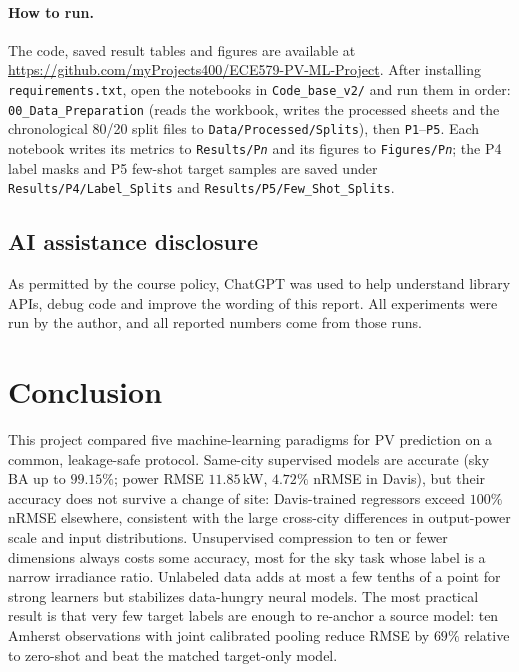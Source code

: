 \documentclass[11pt,letterpaper]{article}
\begin{document}
\paragraph{How to run.} The code, saved result tables and figures are available at
\url{https://github.com/myProjects400/ECE579-PV-ML-Project}. After installing
\texttt{requirements.txt}, open the notebooks in \texttt{Code\_base\_v2/} and run them in order:
\texttt{00\_Data\_Preparation} (reads the workbook, writes the processed sheets and the
chronological 80/20 split files to \texttt{Data/Processed/Splits}), then \texttt{P1}--\texttt{P5}.
Each notebook writes its metrics to \texttt{Results/P\textit{n}} and its figures to
\texttt{Figures/P\textit{n}}; the P4 label masks and P5 few-shot target samples are saved under
\texttt{Results/P4/Label\_Splits} and \texttt{Results/P5/Few\_Shot\_Splits}.

\subsection{AI assistance disclosure}
As permitted by the course policy, ChatGPT was used to help understand
library APIs, debug code and improve the wording of this report. All experiments were run by the
author, and all reported numbers come from those runs.

\section{Conclusion}
This project compared five machine-learning paradigms for PV prediction on a common, leakage-safe
protocol. Same-city supervised models are accurate (sky BA up to $99.15\%$; power RMSE $11.85$\,kW,
$4.72\%$ nRMSE in Davis), but their accuracy does not survive a change of site: Davis-trained
regressors exceed $100\%$ nRMSE elsewhere, consistent with the large cross-city differences
in output-power scale and input distributions.
Unsupervised compression to ten or fewer dimensions always costs some accuracy, most for the sky
task whose label is a narrow irradiance ratio. Unlabeled data adds at most a few tenths of a point
for strong learners but stabilizes data-hungry neural models. The most practical result is that
very few target labels are enough to re-anchor a source model: ten Amherst observations with joint
calibrated pooling reduce RMSE by $69\%$ relative to zero-shot and beat the matched target-only model.
\end{document}
